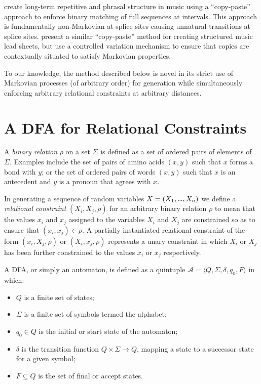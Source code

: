 \documentclass[phd,electronic,oneside,twosidetoc,letterpaper,chaptercenter,parttop,lof,lot]{byumsphd}
\newcommand\mydots{\hbox to .75em{.\hss.\hss.}}
\begin{document}
\citeauthor{collins2017computer} \cite{collins2017computer} create long-term repetitive and phrasal structure in music using a ``copy-paste'' approach to enforce binary matching of full sequences at intervals. This approach is fundamentally non-Markovian at splice sites causing unnatural transitions at splice sites. \citeauthor{pachet2017sampling} \cite{pachet2017sampling} present a similar ``copy-paste'' method for creating structured music lead sheets, but use a controlled variation mechanism to ensure that copies are contextually situated to satisfy Markovian properties.

To our knowledge, the method described below is novel in its strict use of Markovian processes (of arbitrary order) for generation while simultaneously enforcing arbitrary relational constraints at arbitrary distances.

\section{A DFA for Relational Constraints}

A \textit{binary relation} $\rho$ on a set $\Sigma$ is defined as a set of ordered pairs of elements of $\Sigma$. Examples include the set of pairs of amino acids $(x,y)$ such that $x$ forms a bond with $y$; or the set of ordered pairs of words $(x,y)$ such that $x$ is an antecedent and $y$ is a pronoun that agrees with $x$.

In generating a sequence of random variables $X=(X_1,\mydots,X_n)$ we define a \textit{relational constraint} $(X_i,X_j,\rho)$ for an arbitrary binary relation $\rho$ to mean that the values $x_i$ and $x_j$ assigned to the variables $X_i$ and $X_j$ are constrained so as to ensure that $(x_i,x_j)\in\rho$. A partially instantiated relational constraint of the form $(x_i,X_j,\rho)$ or $(X_i,x_j,\rho)$ represents a unary constraint in which $X_i$ or $X_j$ has been further constrained to the values $x_i$ or $x_j$ respectively.

A DFA, or simply an automaton, is defined as a quintuple $\mathcal{A} = \langle Q, \Sigma, \delta, q_0, F\rangle$ in which:
\begin{itemize}
\item $Q$ is a finite set of states;
\item $\Sigma$ is a finite set of symbols termed the alphabet;
\item $q_0 \in Q$ is the initial or start state of the automaton;
\item $\delta$ is the transition function $Q \times \Sigma \rightarrow Q$, mapping a state to a successor state for a given symbol;
\item $F \subseteq Q$ is the set of final or accept states.
\end{itemize}
\end{document}
